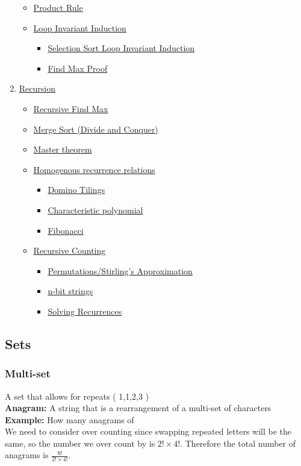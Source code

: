 \documentclass{article}
\begin{document}
\begin{spacing}{1.5}
\begin{enumerate}
\begin{itemize}
\begin{itemize}
    \end{itemize}
    \item \hyperref[sec:rproduct]{Product Rule}
    \item \hyperref[sec:invariant]{Loop Invariant Induction}
    \begin{itemize}
        \item \hyperref[sec:selectionsortproof]{Selection Sort Loop Invariant Induction}
        \item \hyperref[sec:findmaxproof]{Find Max Proof}
    \end{itemize}    
\end{itemize}
\item \hyperref[sec:recursion]{Recursion}
\begin{itemize}
    \item \hyperref[sec:rfindmaxproof]{Recursive Find Max}
    \item \hyperref[sec:mergesort]{Merge Sort (Divide and Conquer)}
    \item \hyperref[sec:master]{Master theorem}
    \item \hyperref[sec:homogenous] {Homogenous recurrence relations}
       \begin{itemize}
       \item \hyperref[sec:domino]{Domino Tilings}
        \item \hyperref[sec:characteristic]{Characteristic polynomial}
        \item \hyperref[sec:fibonacci]{Fibonacci}
    \end{itemize}
    \item \hyperref[sec:rcounting]{Recursive Counting}
    \begin{itemize}
        \item \hyperref[sec:stirling]{Permutations/Stirling's Approximation}
        \item \hyperref[sec:nstring]{n-bit strings}
        \item \hyperref[sec:solver]{Solving Recurrences}
    \end{itemize}
\end{itemize}
\end{enumerate}
\newpage
\subsection{Sets}
\label{sec:sets}
%
\subsubsection{Multi-set}
\label{sec:multiset}
A set that allows for repeats ( {1,1,2,3} )\\
\textbf{Anagram:} A string that is a rearrangement of a multi-set of characters\\
\textbf{Example:} How many anagrams of \text{\color{red}{A}\color{green}{EE}\color{blue}{SSSS}\color{orange}{R}}\\
We need to consider over counting since swapping repeated letters will be the same, so the number we over count by is $2! \times 4!$. Therefore the total number of anagrams is $\frac{8!}{2! \times 4!}$.
%

\end{spacing}
\end{document}
